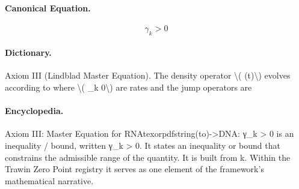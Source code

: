 \paragraph{Canonical Equation.}
\[
\gamma_{k} > 0
\]

\paragraph{Dictionary.}
Axiom III (Lindblad Master Equation). The density operator \textbackslash{}( (t)\textbackslash{}) evolves according to where \textbackslash{}( \_k 0\textbackslash{}) are rates and the jump operators are

\paragraph{Encyclopedia.}
Axiom III: Master Equation for RNAtexorpdfstring(to)->DNA: γ\_k > 0 is an inequality / bound, written γ\_k > 0. It states an inequality or bound that constrains the admissible range of the quantity. It is built from k. Within the Trawin Zero Point registry it serves as one element of the framework's mathematical narrative.

